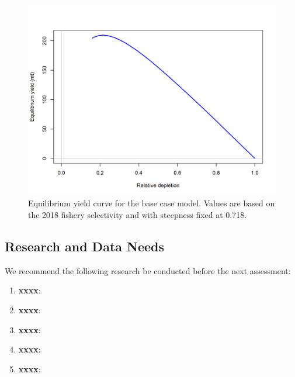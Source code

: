 \documentclass[12pt,]{article}
\begin{document}
\begin{figure}
\centering
\includegraphics{r4ss/plots_mod1/yield1_yield_curve.png}
\caption{Equilibrium yield curve for the base case model. Values are
based on the 2018 fishery selectivity and with steepness fixed at 0.718.
\label{fig:Yield_all}}
\end{figure}

\FloatBarrier

\newpage

\subsection*{Research and Data Needs}\label{research-and-data-needs}

We recommend the following research be conducted before the next
assessment:

\begin{enumerate}

\item \textbf{xxxx}: 

\item \textbf{xxxx}:

\item \textbf{xxxx}:

\item \textbf{xxxx}:

\item \textbf{xxxx}:

\end{enumerate}

\FloatBarrier
\end{document}
